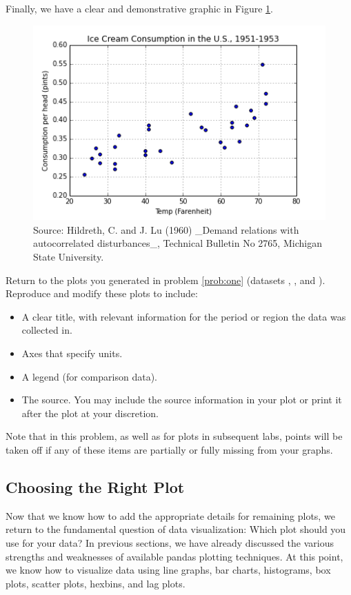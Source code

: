 Finally, we have a clear and demonstrative graphic in Figure \ref{fig:labels}.

\begin{figure}[H] 
    \centering
    \includegraphics[width=.75\textwidth]{Icecream.png}
    \caption{Source:  Hildreth, C. and J. Lu (1960) \_Demand relations with autocorrelated disturbances\_, Technical Bulletin No 2765, Michigan State University.}
    \label{fig:labels}
\end{figure}

\begin{problem}
Return to the plots you generated in problem \ref{prob:one} (datasets , , and ).
Reproduce and modify these plots to include:
\begin{itemize}
\item A clear title, with relevant information for the period or region the data was collected in.
\item Axes that specify units.
\item A legend (for comparison data).
\item The source. You may include the source information in your plot or print it after the plot at your discretion.
\end{itemize}
Note that in this problem, as well as for plots in subsequent labs, points will be taken off if any of these items are partially or fully missing from your graphs.
\end{problem}


\subsection*{Choosing the Right Plot}
Now that we know how to add the appropriate details for remaining plots, we return to the fundamental question of data visualization: Which plot should you use for your data? 
In previous sections, we have already discussed the various strengths and weaknesses of available pandas plotting techniques.
At this point, we know how to visualize data using line graphs, bar charts, histograms, box plots, scatter plots, hexbins, and lag plots. 

